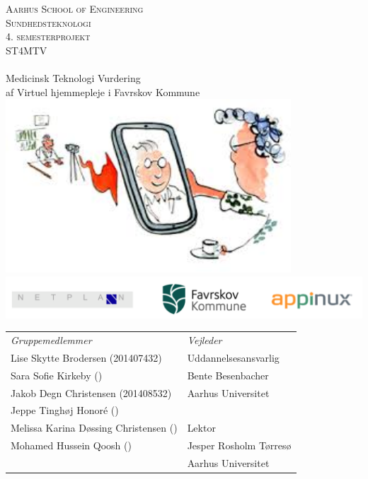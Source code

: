 \begin{titlingpage}
\begin{center}


\textsc{\LARGE Aarhus School of Engineering}\\[1cm]

\textsc{\Large Sundhedsteknologi}\\
\textsc{\Large 4. semesterprojekt}\\
\textsc{\Large ST4MTV}\\[0.5cm]

\noindent\makebox[\linewidth]{\rule{\textwidth}{0.4pt}}\\
[0.5cm]{\Huge Medicinsk Teknologi Vurdering}\\
{af Virtuel hjemmepleje i Favrskov Kommune}
\noindent\makebox[\linewidth]{\rule{\textwidth}{0.4pt}}\\[1cm]

\includegraphics[width=0.8\textwidth]{Figurer/forside}\\
\includegraphics[width=1\textwidth]{Figurer/Snip20160407_38}\\[1.5cm]



\end{center}


\begin{table}[h]
    \centering
    \begin{tabular}{p{8cm} p{5cm}}
        \textit{Gruppemedlemmer} & \textit{Vejleder} \\
        Lise Skytte Brodersen (201407432)	  & Uddannelsesansvarlig   \\
        Sara Sofie Kirkeby ()   & Bente Besenbacher  \\
        Jakob Degn Christensen (201408532)  & Aarhus Universitet   \\
        Jeppe Tinghøj Honoré ()   &   \\
        Melissa Karina Døssing Christensen () & Lektor\\
        Mohamed Hussein Qoosh ()   & Jesper Rosholm Tørresø \\
        	&	Aarhus Universitet \\
    \end{tabular}
\end{table}




\end{titlingpage}

